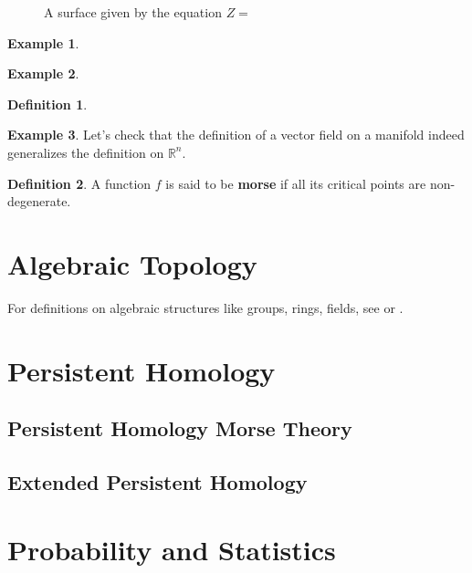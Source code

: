 \documentclass[]{article}
\theoremstyle{definition}
\newtheorem*{definition}{Definition}
\theoremstyle{definition}
\newtheorem*{example}{Example}
\begin{document}
\begin{figure}[H]
	\begin{center}
		
	\end{center}
	\caption{A surface given by the equation $Z=$}
\end{figure}

\begin{example}
	
\end{example}

\begin{example}
	
\end{example}

\begin{definition}
	
\end{definition}

\begin{example}
	Let's check that the definition of a vector field on a manifold indeed generalizes the definition on $\mathbb{R}^n$.
\end{example}



\begin{definition}
	A function $f$ is said to be \textbf{morse} if all its critical points are non-degenerate.
\end{definition}

\section{Algebraic Topology}

For definitions on algebraic structures like groups, rings, fields, see \cite{dummit2003abstract} or \cite{lang2005algebra}.

\section{Persistent Homology}

\subsection{Persistent Homology Morse Theory}

\subsection{Extended Persistent Homology}

\section{Probability and Statistics}
\end{document}
